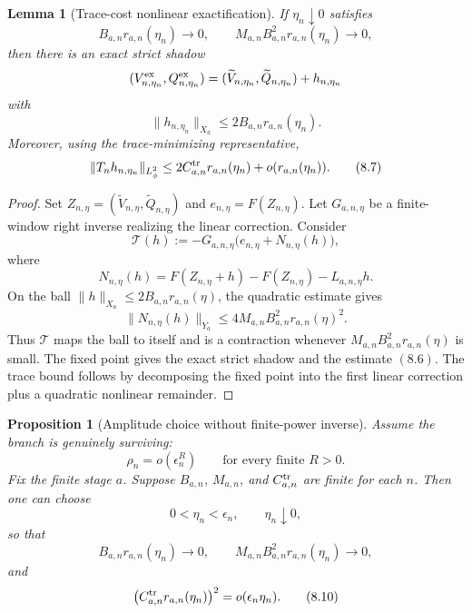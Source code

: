 \documentclass[11pt]{article}
\numberwithin{equation}{section}
\theoremstyle{plain}
\newtheorem{proposition}{Proposition}[section]
\newtheorem{lemma}{Lemma}[section]
\theoremstyle{definition}
\theoremstyle{remark}
\begin{document}
\begin{lemma}[Trace-cost nonlinear exactification]
\label{pV:lem:trace-cost-newton-exactification-expanded}
If \(\eta_n\downarrow0\) satisfies
\[
        B_{a,n}r_{a,n}(\eta_n)\to0,
        \qquad
        M_{a,n}B_{a,n}^2r_{a,n}(\eta_n)\to0,
        \tag{8.5}
\]
then there is an exact strict shadow
\[
        (V^{\rm ex}_{n,\eta_n},Q^{\rm ex}_{n,\eta_n})
        =
        (\widetilde V_{n,\eta_n},\widetilde Q_{n,\eta_n})+h_{n,\eta_n}
\]
with
\[
        \|h_{n,\eta_n}\|_{X_a}
        \le2B_{a,n}r_{a,n}(\eta_n).
        \tag{8.6}
\]
Moreover, using the trace-minimizing representative,
\[
        \|T_nh_{n,\eta_n}\|_{L^2_\phi}
        \le2C^{\rm tr}_{a,n}r_{a,n}(\eta_n)+o(r_{a,n}(\eta_n)).
        \tag{8.7}
\]
\end{lemma}

\begin{proof}
Set \(Z_{n,\eta}=(\widetilde V_{n,\eta},\widetilde Q_{n,\eta})\) and \(e_{n,\eta}=F(Z_{n,\eta})\).  Let \(G_{a,n,\eta}\) be a finite-window right inverse realizing the linear correction.  Consider
\[
        \mathcal T(h):=-G_{a,n,\eta}\bigl(e_{n,\eta}+N_{n,\eta}(h)\bigr),
\]
where
\[
        N_{n,\eta}(h)=F(Z_{n,\eta}+h)-F(Z_{n,\eta})-L_{a,n,\eta}h.
\]
On the ball \(\|h\|_{X_a}\le2B_{a,n}r_{a,n}(\eta)\), the quadratic estimate gives
\[
        \|N_{n,\eta}(h)\|_{Y_a}\le4M_{a,n}B_{a,n}^2r_{a,n}(\eta)^2.
\]
Thus \(\mathcal T\) maps the ball to itself and is a contraction whenever
\(M_{a,n}B_{a,n}^2r_{a,n}(\eta)\) is small.  The fixed point gives the exact strict shadow and the estimate \((8.6)\).  The trace bound follows by decomposing the fixed point into the first linear correction plus a quadratic nonlinear remainder.
\end{proof}

\begin{proposition}[Amplitude choice without finite-power inverse]
\label{pV:prop:amplitude-choice-no-finite-power}
Assume the branch is genuinely surviving:
\[
        \rho_n=o(\epsilon_n^R)
        \qquad\text{for every finite }R>0.
        \tag{8.8}
\]
Fix the finite stage \(a\).  Suppose \(B_{a,n}\), \(M_{a,n}\), and \(C^{\rm tr}_{a,n}\) are finite for each \(n\).  Then one can choose
\[
        0<\eta_n<\epsilon_n,
        \qquad
        \eta_n\downarrow0,
\]
so that
\[
        B_{a,n}r_{a,n}(\eta_n)\to0,
        \qquad
        M_{a,n}B_{a,n}^2r_{a,n}(\eta_n)\to0,
        \tag{8.9}
\]
and
\[
        \bigl(C^{\rm tr}_{a,n}r_{a,n}(\eta_n)\bigr)^2=o(\epsilon_n\eta_n).
        \tag{8.10}
\]
\end{proposition}
\end{document}
